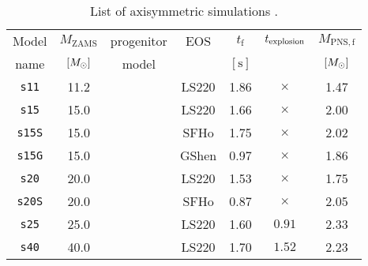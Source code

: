  
 \begin{table}
  \centering
  \begin{tabular}{c|ccc|ccc}
    \hline
    Model & $M_\mathrm{ZAMS} $  & progenitor& EOS & $t_{\mathrm{f}}$& $t_{\rm explosion}$ & $M_{\mathrm{PNS, f}}$\\
    name&  $[M_{\odot}]$ & model & &  $[\mathrm{s}]$& & $[M_{\odot}]$ 
    \\ 
    \hline
    \texttt{s11} & 11.2 & \cite{Woosley_Heger_Weaver__2002__ReviewsofModernPhysics__The_evolution_and_explosion_of_massive_stars}& LS220 & 1.86 & $\times$ &  1.47 
    \\ 
    \texttt{s15} & 15.0 & \cite{Woosley_Heger_Weaver__2002__ReviewsofModernPhysics__The_evolution_and_explosion_of_massive_stars}& LS220 & 1.66 & $\times$ &  2.00 
        \\ 
    \texttt{s15S} & 15.0 & \cite{Woosley_Heger_Weaver__2002__ReviewsofModernPhysics__The_evolution_and_explosion_of_massive_stars}& SFHo & 1.75 & $\times$ &  2.02 
        \\ 
    \texttt{s15G} & 15.0 & \cite{Woosley_Heger_Weaver__2002__ReviewsofModernPhysics__The_evolution_and_explosion_of_massive_stars}& GShen & 0.97 & $\times$ &  1.86
         \\ 
    \texttt{s20} & 20.0 & \cite{Woosley_Heger_Weaver__2002__ReviewsofModernPhysics__The_evolution_and_explosion_of_massive_stars}& LS220 & 1.53 & $\times$ & 1.75 
        \\ 
    \texttt{s20S} & 20.0 & \cite{Woosley_Heger__2007__physrep__Nucleosynthesisandremnantsinmassivestarsofsolarmetallicity} & SFHo & 0.87 & $\times$ & 2.05 
    \\ 
    \texttt{s25} & 25.0 & \cite{Woosley_Heger_Weaver__2002__ReviewsofModernPhysics__The_evolution_and_explosion_of_massive_stars}& LS220 & 1.60 & $0.91$ &  2.33 
        \\ 
    \texttt{s40} & 40.0 & \cite{Woosley_Heger_Weaver__2002__ReviewsofModernPhysics__The_evolution_and_explosion_of_massive_stars}& LS220 & 1.70 & $1.52$ &  2.23 
        \\ \hline
  \end{tabular}
  \caption{%
    List of axisymmetric simulations .  
  }
  \label{Tab:2dSimList}
\end{table}

